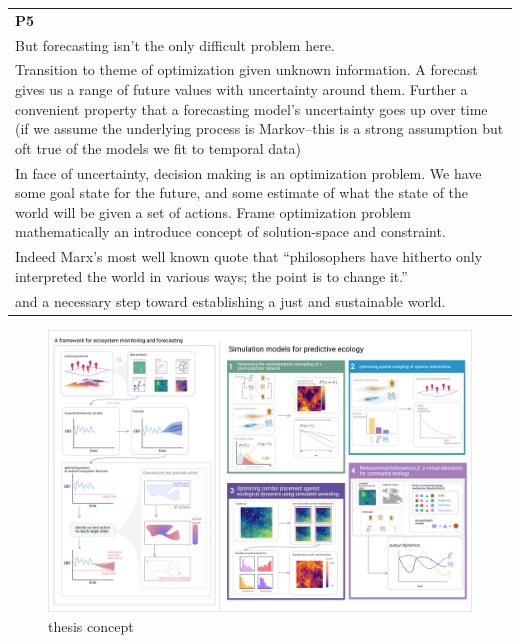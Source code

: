\documentclass[10pt,oneside]{article}
\makeatletter
\def\maxwidth{\ifdim\Gin@nat@width>\linewidth\linewidth
\else\Gin@nat@width\fi}
\let\Oldincludegraphics\includegraphics
\renewcommand{\includegraphics}[1]{\Oldincludegraphics[width=\maxwidth]{#1}}
\makeatother
\begin{document}
\begin{longtable}[]{@{}l@{}}
\toprule
\endhead
\begin{minipage}[t]{0.07\columnwidth}\raggedright
\textbf{P5}\strut
\end{minipage}\tabularnewline
\begin{minipage}[t]{0.07\columnwidth}\raggedright
But forecasting isn't the only difficult problem here.\strut
\end{minipage}\tabularnewline
\begin{minipage}[t]{0.07\columnwidth}\raggedright
Transition to theme of optimization given unknown information. A
forecast gives us a range of future values with uncertainty around them.
Further a convenient property that a forecasting model's uncertainty
goes up over time (if we assume the underlying process is Markov--this
is a strong assumption but oft true of the models we fit to temporal
data)\strut
\end{minipage}\tabularnewline
\begin{minipage}[t]{0.07\columnwidth}\raggedright
In face of uncertainty, decision making is an optimization problem. We
have some goal state for the future, and some estimate of what the state
of the world will be given a set of actions. Frame optimization problem
mathematically an introduce concept of solution-space and
constraint.\strut
\end{minipage}\tabularnewline
\begin{minipage}[t]{0.07\columnwidth}\raggedright
Indeed Marx's most well known quote that ``philosophers have hitherto
only interpreted the world in various ways; the point is to change
it.''\strut
\end{minipage}\tabularnewline
\begin{minipage}[t]{0.07\columnwidth}\raggedright
and a necessary step toward establishing a just and sustainable
world.\strut
\end{minipage}\tabularnewline
\bottomrule
\end{longtable}

\begin{figure}
\hypertarget{fig:thesis}{%
\centering
\includegraphics{./figures/thesisconcept.png}
\caption{thesis concept}\label{fig:thesis}
}
\end{figure}
\end{document}
